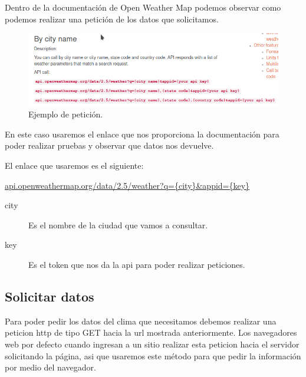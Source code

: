 \documentclass[12pt]{article}
\begin{document}
Dentro de la documentación de Open Weather Map podemos observar como podemos realizar una petición de los datos que solicitamos.

\begin{figure}[H]
    \centering
    \includegraphics[scale=.5]{assets/images/api-2.png}
    \caption{Ejemplo de petición.}
\end{figure}

En este caso usaremos el enlace que nos proporciona la documentación para poder realizar pruebas y observar que datos nos devuelve.

El enlace que usaremos es el siguiente:

\url{api.openweathermap.org/data/2.5/weather?q={city}&appid={key}}

\begin{description}
    \item[city] Es el nombre de la ciudad que vamos a consultar.
    \item[key] Es el token que nos da la api para poder realizar peticiones.
\end{description}

\newpage

\subsection{Solicitar datos}

Para poder pedir los datos del clima que necesitamos debemos realizar una peticion http de tipo GET hacia la url mostrada anteriormente. Los navegadores web por defecto cuando ingresan a un sitio realizar esta peticion hacia el servidor solicitando la página, asi que usaremos este método para que pedir la información por medio del navegador.
\end{document}
